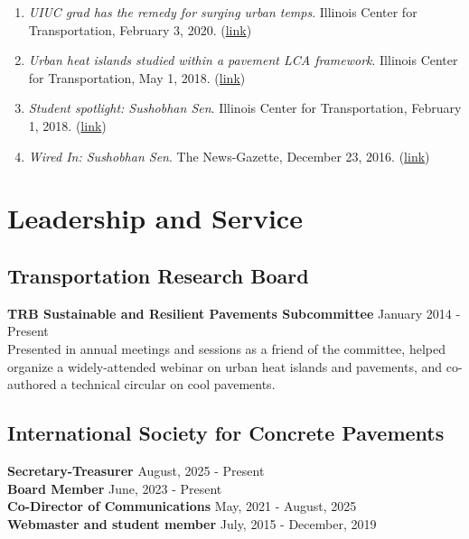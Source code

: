 \documentclass[12pt]{article}
\begin{document}
\begin{enumerate}
	\item \textit{UIUC grad has the remedy for surging urban temps}. Illinois Center for Transportation, February 3, 2020. (\href{https://ict.illinois.edu/news/newsletters/more-newsletters/february-2020/uiuc-grad-has-the-treatment-for-surging-urban-temps}{link})
	\item \textit{Urban heat islands studied within a pavement LCA framework}. Illinois Center for Transportation, May 1, 2018. (\href{https://ict.illinois.edu/news/newsletters/more-newsletters/may-2018/urban-heat-islands-studied-within-a-pavement-lca-framework}{link})
	\item \textit{Student spotlight: Sushobhan Sen}. Illinois Center for Transportation, February 1, 2018. (\href{https://ict.illinois.edu/news/newsletters/more-newsletters/february-2018/student-spotlight-sushobhan-sen}{link})
	\item \textit{Wired In: Sushobhan Sen}. The News-Gazette, December 23, 2016. (\href{https://www.news-gazette.com/multimedia/video/wired-in-sushobhan-sen/article_52527b7b-4b7f-5642-88c8-bf4bb2fd5e2f.html}{link})
\end{enumerate}

\bigskip
\section*{Leadership and Service} 
\hfill
\subsection*{Transportation Research Board}
\textbf{TRB Sustainable and Resilient Pavements Subcommittee} \hfill January 2014 - Present \\
Presented in annual meetings and sessions as a friend of the committee, helped organize a widely-attended webinar on urban heat islands and pavements, and co-authored a technical circular on cool pavements. \\

\subsection*{International Society for Concrete Pavements}
\textbf{Secretary-Treasurer} \hfill August, 2025 - Present \\
\textbf{Board Member} \hfill June, 2023 - Present \\
\textbf{Co-Director of Communications} \hfill May, 2021 - August, 2025 \\
\textbf{Webmaster and student member} \hfill July, 2015 - December, 2019 \\
\end{document}
